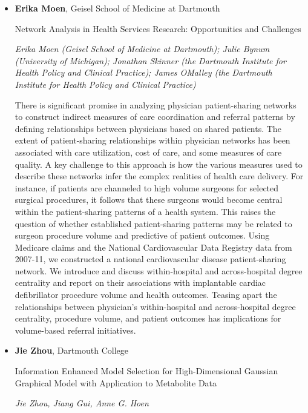 \begin{itemize}
\item \textbf{Erika Moen}, Geisel School of Medicine at Dartmouth

Network Analysis in Health Services Research: Opportunities and Challenges

\emph{\footnotesize Erika Moen (Geisel School of Medicine at Dartmouth); Julie Bynum (University of Michigan); Jonathan Skinner (the Dartmouth Institute for Health Policy and Clinical Practice); James OMalley (the Dartmouth Institute for Health Policy and Clinical Practice)}

There is significant promise in analyzing physician patient-sharing networks to construct indirect measures of care coordination and referral patterns by defining relationships between physicians based on shared patients. The extent of patient-sharing relationships within physician networks has been associated with care utilization, cost of care, and some measures of care quality. A key challenge to this approach is how the various measures used to describe these networks infer the complex realities of health care delivery. For instance, if patients are channeled to high volume surgeons for selected surgical procedures, it follows that these surgeons would become central within the patient-sharing patterns of a health system. This raises the question of whether established patient-sharing patterns may be related to surgeon procedure volume and predictive of patient outcomes. Using Medicare claims and the National Cardiovascular Data Registry data from 2007-11, we constructed a national cardiovascular disease patient-sharing network. We introduce and discuss within-hospital and across-hospital degree centrality and report on their associations with implantable cardiac defibrillator procedure volume and health outcomes. Teasing apart the relationships between physician's within-hospital and across-hospital degree centrality, procedure volume, and patient outcomes has implications for volume-based referral initiatives.

\item \textbf{Jie Zhou}, Dartmouth College

Information Enhanced Model Selection for High-Dimensional Gaussian Graphical Model with Application to Metabolite Data

\emph{\footnotesize Jie Zhou, Jiang Gui, Anne G. Hoen}


\end{itemize}
